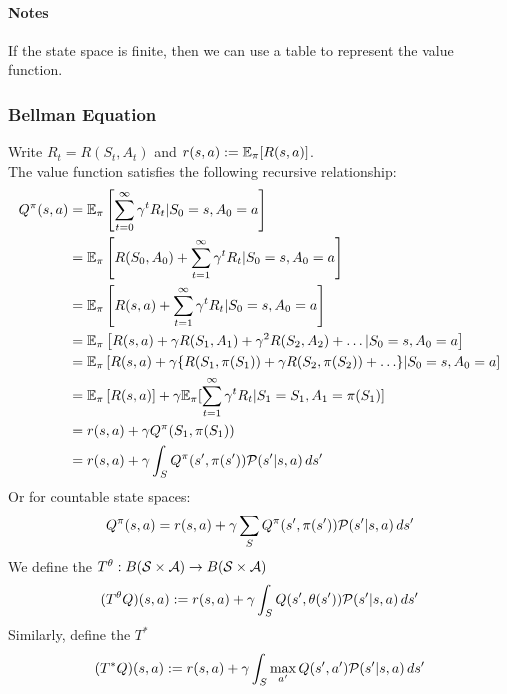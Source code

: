 \documentclass[11pt]{article}
\begin{document}
\paragraph{Notes}
If the state space is finite, then we can use a table to represent the value function.


\subsubsection{Bellman Equation}
Write $R_t = R(S_t, A_t)$ and $r(s,a) := \mathbb{E}_\pi[R(s,a)]$.\\
The value function satisfies the following recursive relationship:
\begin{align}
	Q^\pi(s, a) &= \mathbb{E}_\pi\left[ \sum_{t=0}^\infty \gamma^tR_t|S_0 = s, A_0 = a\right] \\
	&= \mathbb{E}_\pi\left[R(S_0, A_0) + \sum_{t=1}^\infty \gamma^tR_t|S_0 = s, A_0 = a\right] \\
	&= \mathbb{E}_\pi\left[R(s, a) + \sum_{t=1}^\infty \gamma^tR_t|S_0 = s, A_0 = a\right] \\
	&= \mathbb{E}_\pi\left[ R(s, a) + \gamma R(S_1, A_1) + \gamma^2R(S_2, A_2) + \hdots|S_0=s, A_0=a\right]\\
	&= \mathbb{E}_\pi\left[ R(s, a) + \gamma\{R(S_1, \pi(S_1)) + \gamma R(S_2, \pi(S_2)) + \hdots\}|S_0=s, A_0=a\right]\\
	&= \mathbb{E}_\pi\left[ R(s, a) \right] + \gamma\mathbb{E}_\pi[\sum_{t=1}^\infty\gamma^tR_{t}|S_1=S_1, A_1=\pi(S_1)]\\
	&= r(s,a) + \gamma  Q^\pi(S_1, \pi(S_1)) \\
	&= r(s,a) + \gamma \int_S Q^\pi(s', \pi(s'))\mathcal{P}(s'|s,a)\,ds'
\end{align}
Or for countable state spaces:
$$Q^\pi(s, a) = r(s,a) + \gamma \sum_S Q^\pi(s', \pi(s'))\mathcal{P}(s'|s,a)\,ds'$$
We define the  $T^\theta: B(\mathcal{S} \times \mathcal{A}) \rightarrow B(\mathcal{S} \times \mathcal{A})$
$$(T^\theta Q)(s,a) := r(s,a) + \gamma \int_S Q(s', \theta(s'))\mathcal{P}(s'|s,a)\,ds'$$
Similarly, define the  $T^*$
$$(T^* Q)(s,a) := r(s,a) + \gamma \int_S\underset{a'}{\max}\,Q(s', a')\mathcal{P}(s'|s,a)\,ds'$$
\end{document}
